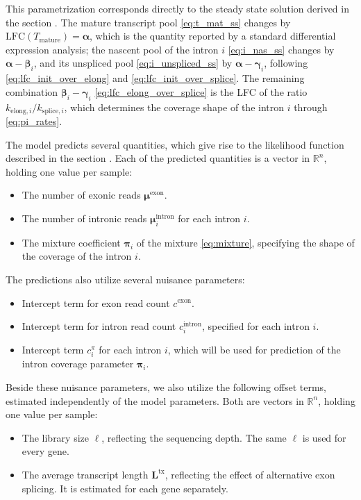 \documentclass[11pt]{article}
\begin{document}
	This parametrization corresponds directly to the steady state solution derived in the section . The mature transcript pool \eqref{eq:t_mat_ss} changes by $\mathrm{LFC}(T_{\mathrm{mature}}) = \boldsymbol{\alpha}$, which is the quantity reported by a standard differential expression analysis; the nascent pool of the intron $i$ \eqref{eq:i_nas_ss} changes by $\boldsymbol{\alpha} - \boldsymbol{\beta}_i$, and its unspliced pool \eqref{eq:i_unspliced_ss} by $\boldsymbol{\alpha} - \boldsymbol{\gamma}_i$, following \eqref{eq:lfc_init_over_elong} and \eqref{eq:lfc_init_over_splice}. The remaining combination $\boldsymbol{\beta}_i - \boldsymbol{\gamma}_i$ \eqref{eq:lfc_elong_over_splice} is the LFC of the ratio $k_{\mathrm{elong},i} / k_{\mathrm{splice},i}$, which determines the coverage shape of the intron $i$ through \eqref{eq:pi_rates}.
	
	The model predicts several quantities, which give rise to the likelihood function described in the section . Each of the predicted quantities is a vector in $\mathbb{R}^{n}$, holding one value per sample:
	\begin{itemize}
		\item The number of exonic reads $\boldsymbol{\mu}^{\mathrm{exon}}$.
		\item The number of intronic reads $\boldsymbol{\mu}^{\mathrm{intron}}_i$ for each intron $i$.
		\item The mixture coefficient $\boldsymbol{\pi}_i$ of the mixture \eqref{eq:mixture}, specifying the shape of the coverage of the intron $i$.
	\end{itemize}

	The predictions also utilize several nuisance parameters:
	
	\begin{itemize}
		\item Intercept term for exon read count $c^{\mathrm{exon}}$.
		\item Intercept term for intron read count $c^{\mathrm{intron}}_{i}$, specified for each intron $i$. 
		\item Intercept term $c^{\pi}_{i}$ for each intron $i$, which will be used for prediction of the intron coverage parameter $\boldsymbol{\pi}_i$.
	\end{itemize}

	Beside these nuisance parameters, we also utilize the following offset terms, estimated independently of the model parameters. Both are vectors in $\mathbb{R}^{n}$, holding one value per sample:
	\begin{itemize}
		\item The library size $\boldsymbol{\ell}$, reflecting the sequencing depth. The same $\boldsymbol{\ell}$ is used for every gene.
		\item The average transcript length $\boldsymbol{L}^{\mathrm{tx}}$, reflecting the effect of alternative exon splicing. It is estimated for each gene separately.
	\end{itemize}
\end{document}
